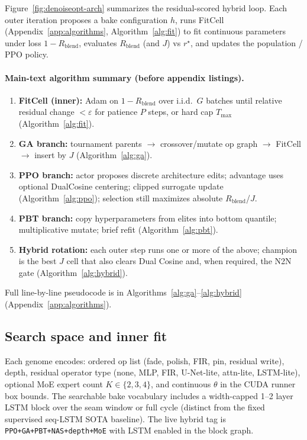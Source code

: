 Figure~\ref{fig:denoiseopt-arch} summarizes the residual-scored hybrid loop.
Each outer iteration proposes a bake configuration $h$, runs FitCell (Appendix~\ref{app:algorithms}, Algorithm~\ref{alg:fit}) to fit continuous parameters under loss $1-R_{\mathrm{blend}}$, evaluates $R_{\mathrm{blend}}$ (and $J$) vs $r^{\star}$, and updates the population / PPO policy.

\paragraph{Main-text algorithm summary (before appendix listings).}
\begin{enumerate}
  \item \textbf{FitCell (inner):} Adam on $1-R_{\mathrm{blend}}$ over i.i.d.\ $G$ batches until relative residual change $<\varepsilon$ for patience $P$ steps, or hard cap $T_{\max}$ (Algorithm~\ref{alg:fit}).
  \item \textbf{GA branch:} tournament parents $\to$ crossover/mutate op graph $\to$ FitCell $\to$ insert by $J$ (Algorithm~\ref{alg:ga}).
  \item \textbf{PPO branch:} actor proposes discrete architecture edits; advantage uses optional DualCosine centering; clipped surrogate update (Algorithm~\ref{alg:ppo}); selection still maximizes absolute $R_{\mathrm{blend}}$/$J$.
  \item \textbf{PBT branch:} copy hyperparameters from elites into bottom quantile; multiplicative mutate; brief refit (Algorithm~\ref{alg:pbt}).
  \item \textbf{Hybrid rotation:} each outer step runs one or more of the above; champion is the best $J$ cell that also clears Dual Cosine and, when required, the N2N gate (Algorithm~\ref{alg:hybrid}).
\end{enumerate}
Full line-by-line pseudocode is in Algorithms~\ref{alg:ga}--\ref{alg:hybrid} (Appendix~\ref{app:algorithms}).



\subsection{Search space and inner fit}
\label{sec:search-space}

Each genome encodes: ordered op list (fade, polish, FIR, pin, residual write), depth, residual operator type (none, MLP, FIR, U-Net-lite, attn-lite, LSTM-lite), optional MoE expert count $K\in\{2,3,4\}$, and continuous $\theta$ in the CUDA runner box bounds.
The searchable bake vocabulary includes a width-capped 1--2 layer LSTM block over the seam window or full cycle (distinct from the fixed supervised seq-LSTM SOTA baseline).
The live hybrid tag is \texttt{PPO+GA+PBT+NAS+depth+MoE} with LSTM enabled in the block graph.

